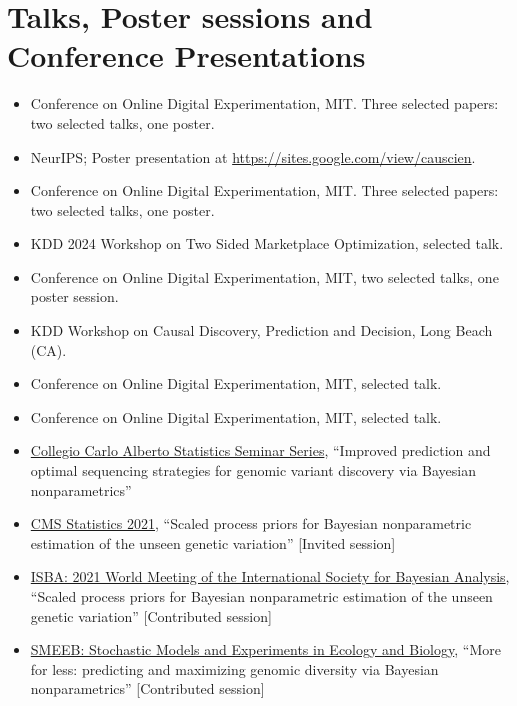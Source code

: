 \documentclass[10pt, a4paper]{article}
\newcommand{\years}[1]{\marginnote{\scriptsize #1}}
\begin{document}
\section*{Talks, Poster sessions and Conference Presentations}
\years{2025}
\begin{itemize}
	\item Conference on Online Digital Experimentation, MIT. Three selected papers: two selected talks, one poster.
	\item NeurIPS; Poster presentation at \href{CauScien}{https://sites.google.com/view/causcien}.
\end{itemize}
\years{2024}
\begin{itemize}
	\item Conference on Online Digital Experimentation, MIT. Three selected papers: two selected talks, one poster.
	\item KDD 2024 Workshop on Two Sided Marketplace Optimization, selected talk.
	\item Conference on Online Digital Experimentation, MIT, two selected talks, one poster session.
\end{itemize}
\years{2023}
\begin{itemize}
	\item KDD Workshop on Causal Discovery, Prediction and Decision, Long Beach (CA).
	\item Conference on Online Digital Experimentation, MIT, selected talk.
\end{itemize}
\years{2022}
\begin{itemize}
	\item Conference on Online Digital Experimentation, MIT, selected talk.
\end{itemize}
\years{2021}
\begin{itemize}
	\item \href{https://www.carloalberto.org/event/lorenzo-masoero-amazon/}{Collegio Carlo Alberto Statistics Seminar Series}, ``{Improved prediction and optimal sequencing strategies for genomic variant discovery via Bayesian nonparametrics}''  
	\item \href{http://www.cmstatistics.org/CMStatistics2021/speakers.php}{CMS Statistics 2021}, ``{Scaled process priors for Bayesian nonparametric
estimation of the unseen genetic variation}'' [Invited session] 
	\item \href{https://events.stat.uconn.edu/ISBA2021/}{ISBA: 2021 World Meeting of the International Society for Bayesian Analysis}, ``{Scaled process priors for Bayesian nonparametric
estimation of the unseen genetic variation}'' [Contributed session] 
	\item \href{https://liphlab.github.io/SMEEB2021/}{SMEEB: Stochastic Models and Experiments in Ecology and Biology}, ``{More for less: predicting and maximizing genomic diversity via Bayesian nonparametrics}'' [Contributed session] 
\end{itemize}
\end{document}
